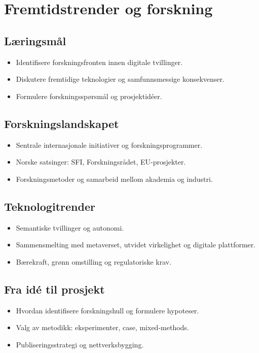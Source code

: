 \chapter{Fremtidstrender og forskning}

\section{Læringsmål}
\begin{itemize}
    \item Identifisere forskningsfronten innen digitale tvillinger.
    \item Diskutere fremtidige teknologier og samfunnsmessige konsekvenser.
    \item Formulere forskningsspørsmål og prosjektidéer.
\end{itemize}

\section{Forskningslandskapet}
\begin{itemize}
    \item Sentrale internasjonale initiativer og forskningsprogrammer.
    \item Norske satsinger: SFI, Forskningsrådet, EU-prosjekter.
    \item Forskningsmetoder og samarbeid mellom akademia og industri.
\end{itemize}

\section{Teknologitrender}
\begin{itemize}
    \item Semantiske tvillinger og autonomi.
    \item Sammensmelting med metaverset, utvidet virkelighet og digitale plattformer.
    \item Bærekraft, grønn omstilling og regulatoriske krav.
\end{itemize}

\section{Fra idé til prosjekt}
\begin{itemize}
    \item Hvordan identifisere forskningshull og formulere hypoteser.
    \item Valg av metodikk: eksperimenter, case, mixed-methods.
    \item Publiseringsstrategi og nettverksbygging.
\end{itemize}

